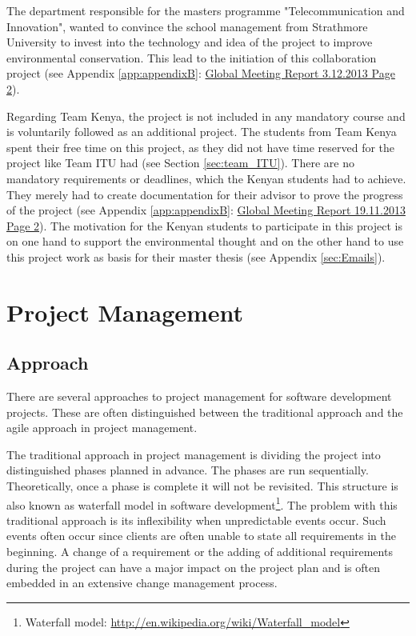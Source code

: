 The department responsible for the masters programme "Telecommunication and Innovation", wanted to convince the school management from Strathmore University to invest into the technology and idea of the project to improve environmental conservation. This lead to the initiation of this collaboration project (see Appendix \ref{app:appendixB}: \hyperlink{GSD20131203.2}{Global Meeting Report 3.12.2013 Page 2}).

Regarding Team Kenya, the project is not included in any mandatory course and is voluntarily followed as an additional project. The students from Team Kenya spent their free time on this project, as they did not have time reserved for the project like Team ITU had (see Section \ref{sec:team_ITU}). There are no mandatory requirements or deadlines, which the Kenyan students had to achieve. They merely had to create documentation for their advisor to prove the progress of the project (see Appendix \ref{app:appendixB}: \hyperlink{GSD20131119.2}{Global Meeting Report 19.11.2013 Page 2}). The motivation for the Kenyan students to participate in this project is on one hand to support the environmental thought and on the other hand to use this project work as basis for their master thesis (see Appendix \ref{sec:Emails}).



\section{Project Management}
\label{sec:project_management}


\subsection{Approach}
\label{sec:approach}
There are several approaches to project management for software development projects. These are often distinguished between the traditional approach and the agile approach in project management.

The traditional approach in project management is dividing the project into distinguished phases planned in advance. The phases are run sequentially. Theoretically, once a phase is complete it will not be revisited. This structure is also known as waterfall model in software development\footnote{Waterfall model: \url{http://en.wikipedia.org/wiki/Waterfall_model}}.
The problem with this traditional approach is its inflexibility when unpredictable events occur. Such events often occur since clients are often unable to state all requirements in the beginning. A change of a requirement or the adding of additional requirements during the project can have a major impact on the project plan and is often embedded in an extensive change management process.

